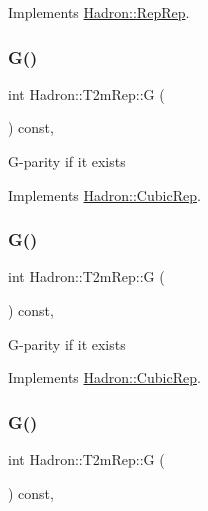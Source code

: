 Implements \mbox{\hyperlink{structHadron_1_1RepRep_a92c8802e5ed7afd7da43ccfd5b7cd92b}{Hadron\+::\+Rep\+Rep}}.

\mbox{\label{structHadron_1_1T2mRep_a267fc6956970178cd9b265262f9d3c6b}} 
\subsubsection{\texorpdfstring{G()}{G()}\hspace{0.1cm}{\footnotesize\ttfamily [1/3]}}
{\footnotesize\ttfamily int Hadron\+::\+T2m\+Rep\+::G (\begin{DoxyParamCaption}{ }\end{DoxyParamCaption}) const\hspace{0.3cm}{\ttfamily [inline]}, {\ttfamily [virtual]}}

G-\/parity if it exists 

Implements \mbox{\hyperlink{structHadron_1_1CubicRep_a52104e43266d1614c00bbd1c3b395458}{Hadron\+::\+Cubic\+Rep}}.

\mbox{\label{structHadron_1_1T2mRep_a267fc6956970178cd9b265262f9d3c6b}} 
\subsubsection{\texorpdfstring{G()}{G()}\hspace{0.1cm}{\footnotesize\ttfamily [2/3]}}
{\footnotesize\ttfamily int Hadron\+::\+T2m\+Rep\+::G (\begin{DoxyParamCaption}{ }\end{DoxyParamCaption}) const\hspace{0.3cm}{\ttfamily [inline]}, {\ttfamily [virtual]}}

G-\/parity if it exists 

Implements \mbox{\hyperlink{structHadron_1_1CubicRep_a52104e43266d1614c00bbd1c3b395458}{Hadron\+::\+Cubic\+Rep}}.

\mbox{\label{structHadron_1_1T2mRep_a267fc6956970178cd9b265262f9d3c6b}} 
\subsubsection{\texorpdfstring{G()}{G()}\hspace{0.1cm}{\footnotesize\ttfamily [3/3]}}
{\footnotesize\ttfamily int Hadron\+::\+T2m\+Rep\+::G (\begin{DoxyParamCaption}{ }\end{DoxyParamCaption}) const\hspace{0.3cm}{\ttfamily [inline]}, {\ttfamily [virtual]}}

